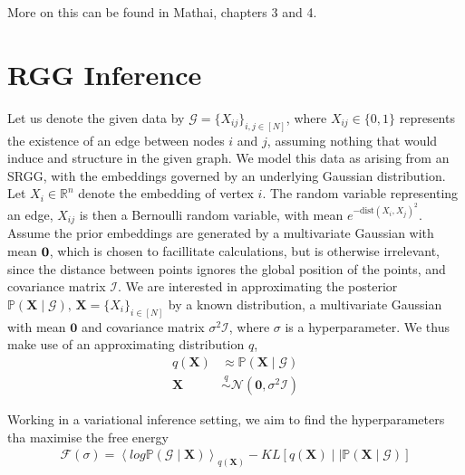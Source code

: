 \documentclass[12pt]{report}
\newcommand{\bs}{\boldsymbol}
\newcommand{\mc}[1]{\mathcal{#1}}
\newcommand{\mb}[1]{\mathbb{#1}}
\renewcommand{\bs}{\boldsymbol}
\begin{document}
More on this can be found in Mathai, chapters 3 and 4.

\chapter{RGG Inference}
Let us denote the given data by $\mc{G} = \{X_{ij}\}_{i, j \in [N]}$, where $X_{ij} \in \{0,1\}$ represents the existence of an edge between nodes $i$ and $j$, assuming nothing that would induce and structure in the given graph. We model this data as arising from an SRGG, with the embeddings governed by an underlying Gaussian distribution. Let $X_i \in \mb{R}^n$ denote the embedding of vertex $i$. The random variable representing an edge, $X_{ij}$ is then a Bernoulli random variable, with mean $e^{-\text{dist}(X_i, X_j)^2}$. \\

Assume the prior embeddings are generated by a multivariate Gaussian with mean $\bf{0}$, which is chosen to facillitate calculations, but is otherwise irrelevant, since the distance between points ignores the global position of the points, and covariance matrix $\mc{I}$. We are interested in approximating the posterior $\mb{P}(\bs{X} \mid \mc{G}),\, \bs{X} = \{X_i\}_{i \in [N]}$ by a known distribution, a multivariate Gaussian with mean $\bs{0}$ and covariance matrix $\sigma^2\mc{I}$, where $\sigma$ is a hyperparameter. We thus make use of an approximating distribution $q$,
\begin{align*}
    q(\bs{X}) &\approx \mb{P}(\bs{X} \mid \mc{G}) \\
    \bs{X} &\overset{q}{\sim} \mc{N}(\bs{0}, \sigma^2\mc{I})
\end{align*}

Working in a variational inference setting, we aim to find the hyperparameters tha maximise the free energy
\begin{align*}
    \mc{F}(\sigma) = \left<log\mb{P}(\mc{G} \mid \bs{X})\right>_{q(\bs{X})} - KL[q(\bs{X}) \mid\mid \mb{P}(\bs{X} \mid \mc{G})] \\
\end{align*}
\end{document}
